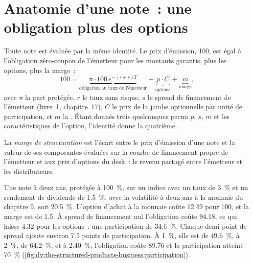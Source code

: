 \section{Anatomie d'une note~: une obligation plus des options}

Toute note est évaluée par la même identité. Le prix d'émission, 100, est égal à l'obligation zéro-coupon de l'émetteur pour les
montants garantis, plus les options, plus la marge~:
\[
100=\underbrace{\pi\cdot100\,e^{-(r+s)T}}_{\text{obligation au taux de l'émetteur}}+\underbrace{p\cdot C}_{\text{options}}+
\underbrace{m}_{\text{marge}},
\]
avec $\pi$ la part protégée, $r$ le taux sans risque, $s$ le spread de financement de l'émetteur (livre~1, chapitre~17), $C$ le prix de
la jambe optionnelle par unité de participation, et $m$ la . Étant donnés trois quelconques parmi $p$, $s$, $m$ et les caractéristiques
de l'option, l'identité donne la quatrième.

\begin{definition}\label{def:dv:the-structured-products-business:margin}
La \emph{marge de structuration} est l'écart entre le prix d'émission d'une note et la valeur de ses
composantes évaluées sur la courbe de financement propre de l'émetteur et aux prix d'options du desk~: le revenu partagé entre l'émetteur et les
distributeurs.
\end{definition}

\begin{example}\label{ex:dv:the-structured-products-business:participation}
Une note à deux ans, protégée à 100~\%, sur un indice avec un taux de 3~\% et un rendement de dividende de 1.5~\%, avec la volatilité à deux ans
à la monnaie du chapitre 9, soit 20.5~\%. L'option d'achat à la monnaie coûte 12.49 pour 100, et la marge est de 1.5. À spread de financement nul
l'obligation coûte 94.18, ce qui laisse 4.32 pour les options~: une participation de 34.6~\%. Chaque demi-point de spread ajoute environ 7.5
points de participation. À 1~\%, elle est de 49.6~\%, à 2~\%, de 64.2~\%, et à 2.40~\%, l'obligation coûte 89.76 et la participation atteint
70~\% (\cref{fig:dv:the-structured-products-business:participation}).
\end{example}


